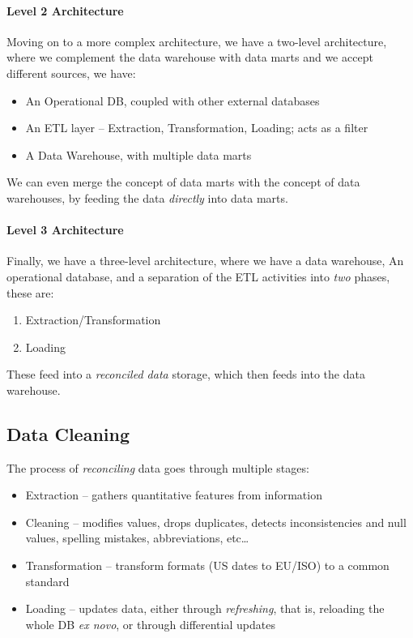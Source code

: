\documentclass[openright, twoside, twocolumn]{report}
\begin{document}
\paragraph{Level 2 Architecture}

Moving on to a more complex architecture, we have a two-level architecture,
where we complement the data warehouse with data marts and we accept
different sources, we have:

\begin{itemize}
  \item An Operational DB, coupled with other external databases
  \item An ETL layer -- Extraction, Transformation, Loading; acts as a filter
  \item A Data Warehouse, with multiple data marts
\end{itemize}

We can even merge the concept of data marts with the concept of data warehouses,
by feeding the data \emph{directly} into data marts.

\paragraph{Level 3 Architecture}

Finally, we have a three-level architecture, where we have a data warehouse,
An operational database, and a separation of the ETL activities into
\emph{two} phases, these are:

\begin{enumerate}
  \item Extraction/Transformation
  \item Loading
\end{enumerate}

These feed into a \emph{reconciled data} storage, which then feeds into
the data warehouse.

\subsection{Data Cleaning}

The process of \emph{reconciling} data goes through multiple stages:

\begin{itemize}
  \item Extraction -- gathers quantitative features from information
  \item Cleaning -- modifies values, drops duplicates, detects inconsistencies and
  null values, spelling mistakes, abbreviations, etc\dots
  \item Transformation -- transform formats (US dates to EU/ISO) to a common
  standard
  \item Loading -- updates data, either through \emph{refreshing}, that is, reloading
  the whole DB \emph{ex novo}, or through differential updates
\end{itemize}
\end{document}
